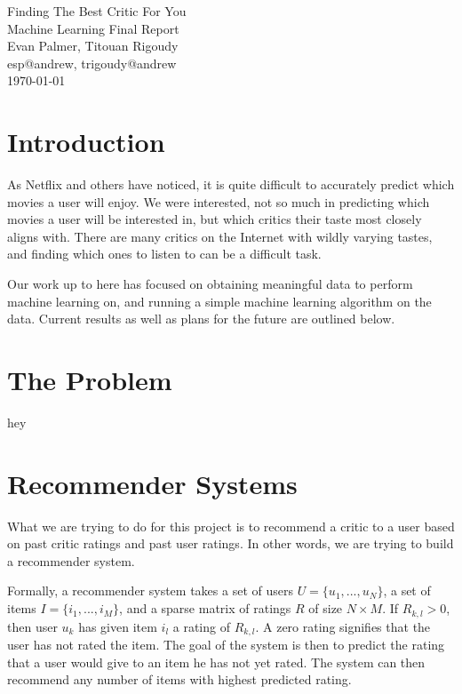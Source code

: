 \documentclass[12pt]{article}
\makeatletter
\newcommand{\myname}{Evan Palmer, Titouan Rigoudy}
\newcommand{\myandrew}{esp@andrew, trigoudy@andrew}
\newcommand{\thedate}{\today}
\makeatother
\begin{document}
	\medskip    
	\thispagestyle{plain}
	\begin{center}                 
	{\LARGE Finding The Best Critic For You} \\
	\medskip
	Machine Learning Final Report \\
	\smallskip
	\myname \\
	\myandrew \\
	\thedate \\
	\end{center}
	\vspace{0.5cm}

\section{Introduction}

As Netflix and others have noticed, it is quite difficult to accurately predict which movies a user will enjoy. We were interested, not so much in predicting which movies a user will be interested in, but which critics their taste most closely aligns with. There are many critics on the Internet with wildly varying tastes, and finding which ones to listen to can be a difficult task.

Our work up to here has focused on obtaining meaningful data to perform machine learning on, and running a simple machine learning algorithm on the data. Current results as well as plans for the future are outlined below.

\section{The Problem}

hey




\section{Recommender Systems}

	What we are trying to do for this project is to recommend a critic to a user based on past critic ratings and past user ratings. In other words, we are trying to build a recommender system.

	Formally, a recommender system takes a set of users $U = \{u_1, ..., u_N\}$, a
	set of items $I = \{i_1, ..., i_M\}$, and a sparse matrix of ratings
	$R$ of size $N \times M$. If $R_{k,l} > 0$, then user $u_k$ has given item $i_l$ a rating of $R_{k,l}$. A zero rating signifies that the
	user has not rated the item. The goal of the system is then to predict the rating that a user would give to an item he has not yet rated. The system can
	then recommend any number of items with highest predicted rating.
\end{document}
